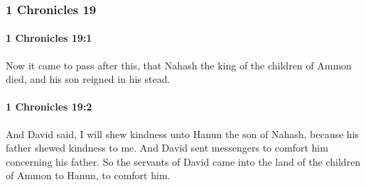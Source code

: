 	\subsubsection{1 Chronicles 19} %
		\label{1CHRONICLES-19}

		\paragraph{1 Chronicles 19:1} %
			\label{1CHRONICLES-19-1}

			Now it came to pass after this, that Nahash the king of the children of Ammon died, and his son reigned in his stead.


		\paragraph{1 Chronicles 19:2} %
			\label{1CHRONICLES-19-2}

			And David said, I will shew kindness unto Hanun the son of Nahash, because his father shewed kindness to me. And David sent messengers to comfort him concerning his father. So the servants of David came into the land of the children of Ammon to Hanun, to comfort him.

